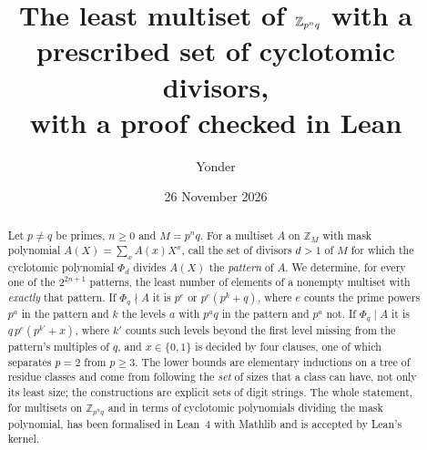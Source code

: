 \documentclass[11pt,a4paper]{amsart}
\title[The least multiset of $\Z_{p^nq}$ with given cyclotomic divisors]{The least multiset of $\Z_{p^nq}$
with a prescribed set of cyclotomic divisors,\\ with a proof checked in Lean}
\author{Yonder}
\date{26 November 2026}
\theoremstyle{definition}
\theoremstyle{remark}
\newcommand{\Z}{\mathbb{Z}}
\begin{document}
\begin{abstract}
Let $p\ne q$ be primes, $n\ge 0$ and $M=p^nq$. For a multiset $A$ on $\Z_M$ with mask polynomial
$A(X)=\sum_x A(x)X^x$, call the set of divisors $d>1$ of $M$ for which the cyclotomic polynomial $\Phi_d$ divides $A(X)$ the \emph{pattern} of $A$.
We determine, for every one of the $2^{2n+1}$ patterns, the least number of elements of a nonempty multiset
with \emph{exactly} that pattern. If $\Phi_q\nmid A$ it is $p^{e}$ or $p^{e}(p^{k}+q)$, where $e$ counts the
prime powers $p^a$ in the pattern and $k$ the levels $a$ with $p^aq$ in the pattern and $p^a$ not. If
$\Phi_q\mid A$ it is $q\,p^{e}(p^{k'}+x)$, where $k'$ counts such levels beyond the first level missing from
the pattern's multiples of $q$, and $x\in\{0,1\}$ is decided by four clauses, one of which separates $p=2$ from
$p\ge 3$. The lower bounds are elementary inductions on a tree of residue classes and come from following the \emph{set} of sizes that a class can have, not only its least size; the constructions are explicit sets of digit strings.
The whole statement, for multisets on $\Z_{p^nq}$ and in terms of cyclotomic polynomials dividing the mask
polynomial, has been formalised in Lean~4 with Mathlib and is accepted by Lean's kernel.
\end{abstract}

\maketitle
\end{document}
